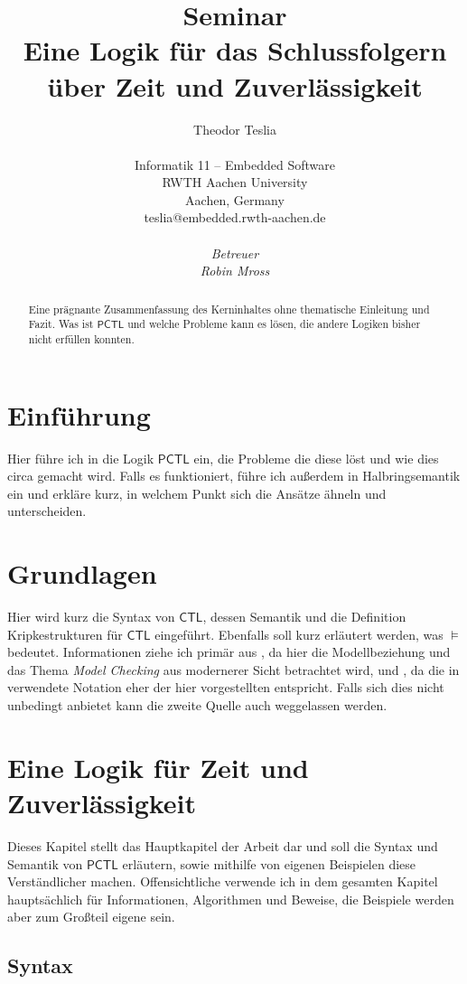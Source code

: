 \documentclass{lni}
\author{
	Theodor Teslia \\ 
	\\ 
	Informatik 11 -- Embedded Software \\ 
	RWTH Aachen University \\ 
	Aachen, Germany \\ 
	teslia@embedded.rwth-aachen.de\\
	\\
	\textit{Betreuer}\\
	\textit{Robin Mross}\\ %
}
\title{\small{Seminar} \\ \vspace{0.5cm} \Large{Eine Logik für das Schlussfolgern über Zeit und Zuverlässigkeit}}
\newcommand{\CTL}{\mathsf{CTL}}
\newcommand{\PCTL}{\mathsf{PCTL}}
\begin{document}
\maketitle

\begin{abstract}
Eine prägnante Zusammenfassung des Kerninhaltes ohne thematische Einleitung und Fazit. Was ist $\PCTL$ und welche Probleme kann es lösen, die andere Logiken bisher nicht erfüllen konnten.
\end{abstract}

\section{Einführung}

Hier führe ich in die Logik $\PCTL$ ein, die Probleme die diese löst und wie dies circa gemacht wird.
Falls es funktioniert, führe ich außerdem in Halbringsemantik ein und erkläre kurz, in welchem Punkt sich die Ansätze ähneln und unterscheiden.

\section{Grundlagen}

Hier wird kurz die Syntax von $\CTL$, dessen Semantik und die Definition Kripkestrukturen für $\CTL$ eingeführt. Ebenfalls soll kurz erläutert werden, was $\models$ bedeutet. Informationen ziehe ich primär aus \cite{baier2008principles}, da hier die Modellbeziehung und das Thema \textit{Model Checking} aus modernerer Sicht betrachtet wird, und \cite{clarke1981design}, da die in \cite{hansson1994logic} verwendete Notation eher der hier vorgestellten entspricht. Falls sich dies nicht unbedingt anbietet kann die zweite Quelle auch weggelassen werden.

\section{Eine Logik für Zeit und Zuverlässigkeit}

Dieses Kapitel stellt das Hauptkapitel der Arbeit dar und soll die Syntax und Semantik von $\PCTL$ erläutern, sowie mithilfe von eigenen Beispielen diese Verständlicher machen. Offensichtliche verwende ich in dem gesamten Kapitel hauptsächlich \cite{hansson1994logic} für Informationen, Algorithmen und Beweise, die Beispiele werden aber zum Großteil eigene sein.

\subsection{Syntax}
\end{document}
